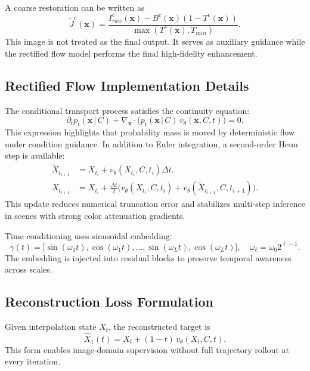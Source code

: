 A coarse restoration can be written as
\begin{equation}
\widetilde{J}^{c}(\mathbf{x}) = \frac{I_{raw}^{c}(\mathbf{x}) - B^{c}(\mathbf{x})(1-T^{c}(\mathbf{x}))}{\max(T^{c}(\mathbf{x}),T_{min})}.
\label{eq:supp_coarse_restore}
\end{equation}
This image is not treated as the final output. It serves as auxiliary guidance while the rectified flow model performs the final high-fidelity enhancement.

\subsection{Rectified Flow Implementation Details}
The conditional transport process satisfies the continuity equation:
\begin{equation}
\partial_t p_t(\mathbf{x}\,|\,C) + \nabla_{\mathbf{x}}\cdot\bigl(p_t(\mathbf{x}\,|\,C)\,v_\theta(\mathbf{x},C,t)\bigr)=0.
\label{eq:supp_continuity}
\end{equation}
This expression highlights that probability mass is moved by deterministic flow under condition guidance. In addition to Euler integration, a second-order Heun step is available:
\begin{align}
\widetilde{X}_{t_{i+1}} &= X_{t_i} + v_\theta(X_{t_i},C,t_i)\Delta t,\\
X_{t_{i+1}} &= X_{t_i} + \frac{\Delta t}{2}\Big(v_\theta(X_{t_i},C,t_i)+v_\theta(\widetilde{X}_{t_{i+1}},C,t_{i+1})\Big).
\label{eq:supp_heun}
\end{align}
This update reduces numerical truncation error and stabilizes multi-step inference in scenes with strong color attenuation gradients.

Time conditioning uses sinusoidal embedding:
\begin{equation}
\gamma(t)=\big[\sin(\omega_1 t),\cos(\omega_1 t),\dots,\sin(\omega_L t),\cos(\omega_L t)\big],\quad \omega_\ell=\omega_0 2^{\ell-1}.
\label{eq:supp_time_embed}
\end{equation}
The embedding is injected into residual blocks to preserve temporal awareness across scales.

\subsection{Reconstruction Loss Formulation}
Given interpolation state $X_t$, the reconstructed target is
\begin{equation}
\widehat{X}_1(t)=X_t+(1-t)\,v_\theta(X_t,C,t).
\label{eq:supp_x1hat}
\end{equation}
This form enables image-domain supervision without full trajectory rollout at every iteration.

